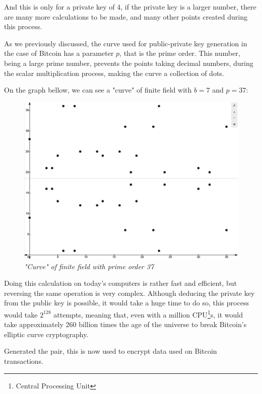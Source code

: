 \documentclass{article}
\begin{document}
And this is only for a private key of 4, if the private key is a larger number, there are many more calculations to be made, and many other points created during this process. 

As we previously discussed, the curve used for public-private key generation in the case of Bitcoin has a parameter \(p\), that is the prime order. This number, being a large prime number, prevents the points taking decimal numbers, during the scalar multiplication process, making the curve a collection of dots.

On the graph bellow, we can see a "curve" of finite field with \(b = 7\) and \(p = 37\):

\begin{figure}[H]
    \begin{center}
        \includegraphics[width=0.6 \textwidth]{images/finite_field_b7_p37.png}
        \caption{\textit{"Curve" of finite field with prime order 37}}
    \end{center}
\end{figure}

Doing this calculation on today's computers is rather fast and efficient, but reversing the same operation is very complex. Although deducing the private key from the public key is possible, it would take a huge time to do so, this process would take \(2^{128}\) attempts, meaning that, even with a million CPU\footnote{Central Processing Unit}s, it would take approximately 260 billion times the age of the universe to break Bitcoin's elliptic curve cryptography.

Generated the pair, this is now used to encrypt data used on Bitcoin transactions.






\nocite{*}
\printbibliography
\end{document}
